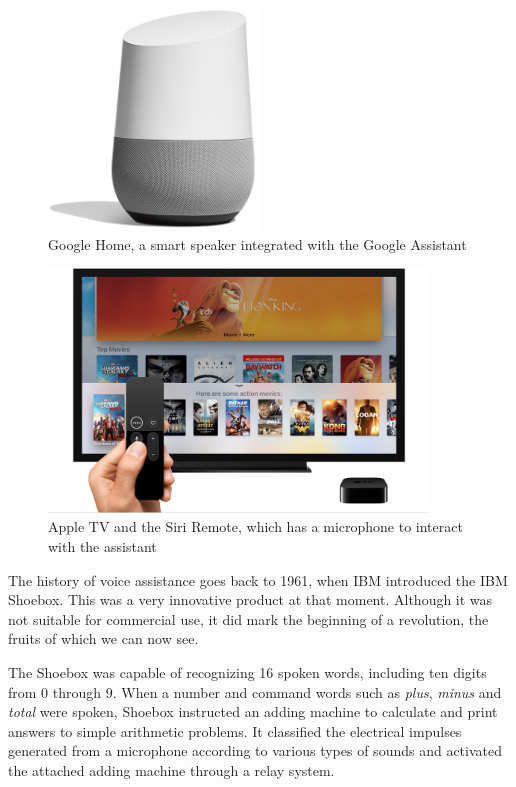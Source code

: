 \begin{figure}
	\centering
	\includegraphics[width=0.5\textwidth]{images/Chapter_03/google-home.png}
	\caption{Google Home, a smart speaker integrated with the Google Assistant}
	\label{fig:google-home}
\end{figure}

\begin{figure}
	\centering
	\includegraphics[width=0.9\textwidth]{images/Chapter_03/apple-tv.jpg}
	\caption{Apple TV and the Siri Remote, which has a microphone to interact with the assistant}
	\label{fig:apple-tv}
\end{figure}

The history of voice assistance goes back to 1961, when IBM introduced the IBM Shoebox.\cite{voicebotTimeline} 
This was a very innovative product at that moment. Although it was not suitable for commercial use, it did mark the 
beginning of a revolution, the fruits of which we can now see. 

The Shoebox was capable of recognizing 16 spoken words, including ten digits from 0 through 9. When a number and 
command words such as \textit{plus}, \textit{minus} and \textit{total} were spoken, Shoebox instructed an adding machine 
to calculate and print answers to simple arithmetic problems. It classified the electrical impulses generated from a microphone
according to various types of sounds and activated the attached adding machine through a relay system.\cite{ibmArchivesShoebox}

